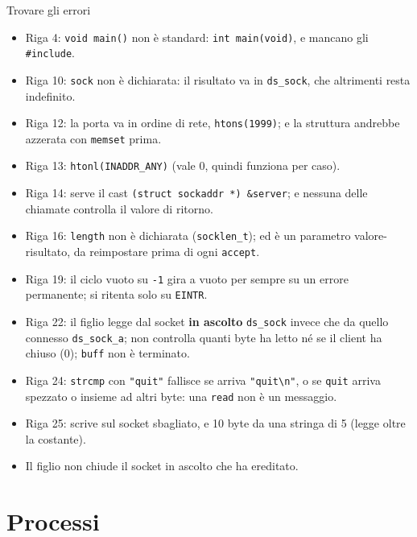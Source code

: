 \begin{esercizio}{Trovare gli errori}
\svolgimento
\begin{itemize}
    \item Riga 4: \texttt{void main()} non è standard: \texttt{int main(void)}, e mancano gli \texttt{\#include}.
    \item Riga 10: \texttt{sock} non è dichiarata: il risultato va in \texttt{ds\_sock}, che altrimenti resta indefinito.
    \item Riga 12: la porta va in ordine di rete, \texttt{htons(1999)}; e la struttura andrebbe azzerata con \texttt{memset} prima.
    \item Riga 13: \texttt{htonl(INADDR\_ANY)} (vale 0, quindi funziona per caso).
    \item Riga 14: serve il cast \texttt{(struct sockaddr *) \&server}; e nessuna delle chiamate controlla il valore di ritorno.
    \item Riga 16: \texttt{length} non è dichiarata (\texttt{socklen\_t}); ed è un parametro valore-risultato, da reimpostare prima di ogni
          \texttt{accept}.
    \item Riga 19: il ciclo vuoto su \texttt{-1} gira a vuoto per sempre su un errore permanente; si ritenta solo su \texttt{EINTR}.
    \item Riga 22: il figlio legge dal socket \textbf{in ascolto} \texttt{ds\_sock} invece che da quello connesso \texttt{ds\_sock\_a};
          non controlla quanti byte ha letto né se il client ha chiuso (0); \texttt{buff} non è terminato.
    \item Riga 24: \texttt{strcmp} con \texttt{"quit"} fallisce se arriva \texttt{"quit\textbackslash n"}, o se \texttt{quit} arriva spezzato
          o insieme ad altri byte: una \texttt{read} non è un messaggio.
    \item Riga 25: scrive sul socket sbagliato, e 10 byte da una stringa di 5 (legge oltre la costante).
    \item Il figlio non chiude il socket in ascolto che ha ereditato.
\end{itemize}
\end{esercizio}

\section{Processi}

